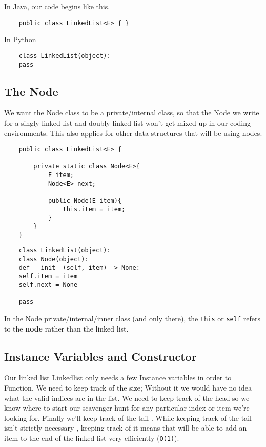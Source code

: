 In Java, our code begins like this.
\begin{verbatim}
	public class LinkedList<E> { }
\end{verbatim}


In Python
\begin{verbatim}
	class LinkedList(object):
	pass
\end{verbatim}


\subsection{The Node}
We want the Node class to be a private/internal class, so that the Node we write for a singly linked list and doubly linked list won't get mixed up in our coding environments.
This also applies for other data structures that will be using nodes.

\begin{verbatim}
	public class LinkedList<E> { 
		
		private static class Node<E>{
			E item;
			Node<E> next;
			
			public Node(E item){
				this.item = item;
			}
		}
	}
\end{verbatim}

\begin{verbatim}
	class LinkedList(object):
	class Node(object):
	def __init__(self, item) -> None:
	self.item = item
	self.next = None
	
	pass
\end{verbatim}

In the Node private/internal/inner class (and only there), the \texttt{this} or \texttt{self} refers to the \textbf{node} rather than the linked list.





\subsection{Instance Variables and Constructor}

Our linked list Linkedlist only needs a few Instance  variables in order to Function. We need to keep track of the size; Without it we would have no idea what the valid indices are in the list. We need to keep track of the head so we know where to start our scavenger hunt for any particular index or item we're looking for.  Finally we'll keep track of the tail . While keeping track of the tail isn't strictly necessary , keeping track of it means that will be able to add an item to the end of the linked list very efficiently (\texttt{O(1)}).

